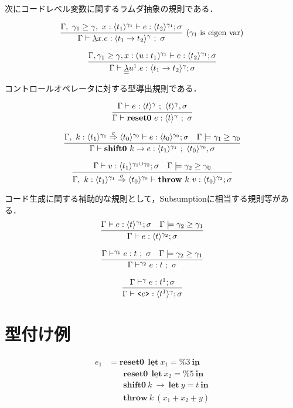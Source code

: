 \documentclass[T]{compsoft}
\newcommand\Resetz{\textbf{reset0}}
\newcommand\Shiftz{\textbf{shift0}}
\newcommand\Throw{\textbf{throw}}
\newcommand\resetz[1]{\Resetz~{#1}}
\newcommand\shiftz[2]{\Shiftz~{#1}\to{#2}}
\newcommand\throw[2]{\Throw~{#1}~{#2}}
\newcommand\cfun[2]{\underline{\lambda}{#1}.{#2}}
\newcommand\ccfun[2]{\underline{\underline{\lambda}}{#1}.{#2}}
\newcommand\cPlus{\underline{\textbf{+}}}
\newcommand\cLet{\underline{\textbf{let}}}
\newcommand\cIn{\underline{\textbf{in}}}
\newcommand\csp[1]{\texttt{\%}{#1}}
\newcommand\code[1]{\texttt{<}{#1}\texttt{>}}
\newcommand\codeT[2]{\langle{#1}\rangle^{#2}}
\newcommand\contT[3]{{#1} \stackrel{#3}{\Rightarrow} {#2}}
\newcommand\ord{\ge}
\theoremstyle{break}
\begin{document}
次にコードレベル変数に関するラムダ抽象の規則である．

\[
  \infer[(\gamma_1~\text{is eigen var})]
  {\Gamma \vdash \cfun{x}{e} : \codeT{t_1\to t_2}{\gamma} ~;~ \sigma}
  {\Gamma,~\gamma_1 \ord \gamma,~x:\codeT{t_1}{\gamma_1} \vdash e
    : \codeT{t_2}{\gamma_1}; \sigma}
\]

\[
  \infer
  {\Gamma \vdash \ccfun{u^1}{e} : \codeT{t_1 \to t_2}{\gamma} ; \sigma}
  {\Gamma, \gamma_1 \ord \gamma, x : (u : t_1)^{\gamma_1} \vdash e : \codeT{t_2}{\gamma_1} ; \sigma}
\]

コントロールオペレータに対する型導出規則である．

\[
  \infer{\Gamma \vdash \resetz{e} : \codeT{t}{\gamma} ~;~ \sigma}
  {\Gamma \vdash e : \codeT{t}{\gamma} ~;~ \codeT{t}{\gamma}, \sigma}
\]

\[
  \infer{\Gamma \vdash \shiftz{k}{e} : \codeT{t_1}{\gamma_1} ~;~ \codeT{t_0}{\gamma_0},\sigma}
  {\Gamma,~k:\contT{\codeT{t_1}{\gamma_1}}{\codeT{t_0}{\gamma_0}}{\sigma}
    \vdash e : \codeT{t_0}{\gamma_0} ; \sigma
    & \Gamma \models \gamma_1 \ord \gamma_0
  }
\]

\[
  \infer
  {\Gamma,~k:\contT{\codeT{t_1}{\gamma_1}}{\codeT{t_0}{\gamma_0}}{\sigma}
    \vdash \throw{k}{v} : \codeT{t_0}{\gamma_2} ; \sigma}
  {\Gamma
    \vdash v : \codeT{t_1}{\gamma_1 \cup \gamma_2} ; \sigma
    & \Gamma \models \gamma_2 \ord \gamma_0
  }
\]

コード生成に関する補助的な規則として，Subsumptionに相当する規則等がある．
\[
  \infer
  {\Gamma \vdash e : \codeT{t}{\gamma_2} ; \sigma}
  {\Gamma \vdash e : \codeT{t}{\gamma_1} ; \sigma
    & \Gamma \models \gamma_2 \ord \gamma_1
  }
\]

\[
  \infer
  {\Gamma \vdash^{\gamma_2} e : t ~;~ \sigma}
  {\Gamma \vdash^{\gamma_1} e : t ~;~ \sigma
    & \Gamma \models \gamma_2 \ord \gamma_1
  }
\]


\[
  \infer
  {\Gamma \vdash \code{e} : \codeT{t^1}{\gamma} ; \sigma}
  {\Gamma \vdash^{\gamma} e : t^1 ; \sigma}
\]


\section{型付け例}

\begin{align*}
  e_1 & = \Resetz ~~\cLet~x_1=\csp{3}~\cIn \\
      & \phantom{=}~~ \Resetz ~~\cLet~x_2=\csp{5}~\cIn \\
      & \phantom{=}~~ \Shiftz~k~\to~\cLet~y=t~\cIn \\
      & \phantom{=}~~ \Throw~k~(x_1~\cPlus~x_2~\cPlus~y)
\end{align*}
\end{document}

